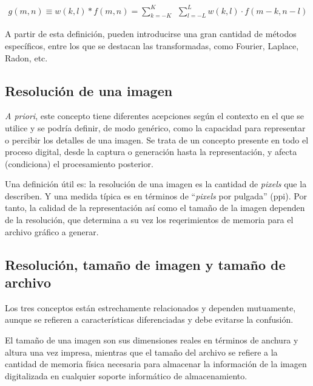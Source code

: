 \begin{eqnarray}
	g(m, n) \equiv w(k, l) \ast f(m, n) = \sum _{k=-K}^{K} \, \; \sum _{l=-L}^{L} w(k, l) \cdot f(m-k, n-l)
\label{EqXXIV}
\end{eqnarray}

A partir de esta definici\'on, pueden introducirse una gran cantidad de m\'etodos espec\'ificos, entre los que se destacan las transformadas, como Fourier, 
Laplace, Radon, etc.


\subsection{Resoluci\'on de una imagen}
%
\textit{A priori}, este concepto tiene diferentes acepciones seg\'un el contexto en el que se utilice y se podr\'ia definir, de modo gen\'erico, como
la capacidad para representar o percibir los detalles de una imagen.
%
Se trata de un concepto presente en todo el proceso digital, desde la captura o generaci\'on hasta la representaci\'on, y afecta (condiciona) el 
procesamiento posterior.
%

%
Una definici\'on \'util es: la resoluci\'on de una imagen es la cantidad de \textit{pixels} que la describen. 
%
Y una medida t\'ipica es en t\'erminos de ``\textit{pixels} por pulgada'' (ppi). 
%
Por tanto, la calidad de la representaci\'on as\'i como el tama\~no de la imagen dependen de la resoluci\'on, que determina a su vez los reqerimientos 
de memoria para el archivo gr\'afico a generar.


\subsection{Resoluci\'on, tama\~no de imagen y tama\~no de archivo}

Los tres conceptos est\'an estrechamente relacionados y dependen mutuamente, aunque se refieren a caracter\'isticas diferenciadas y debe evitarse 
la confusi\'on.
%

%
El tama\~no de una imagen son sus dimensiones reales en t\'erminos de anchura y altura una vez impresa, mientras que el tama\~no del archivo se refiere a la 
cantidad de memoria f\'isica necesaria para almacenar la informaci\'on de la imagen digitalizada en cualquier soporte inform\'atico de almacenamiento.
%

